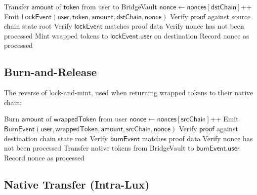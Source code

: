 \documentclass[11pt,a4paper]{article}
\begin{document}
\begin{algorithm}[H]
\caption{Lock-and-Mint Transfer Protocol}
\label{alg:lock_mint}
\begin{algorithmic}[1]
    \State Transfer $\mathsf{amount}$ of $\mathsf{token}$ from user to BridgeVault
    \State $\mathsf{nonce} \gets \mathsf{nonces}[\mathsf{dstChain}]$++
    \State Emit $\mathsf{LockEvent}(\mathsf{user}, \mathsf{token}, \mathsf{amount}, \mathsf{dstChain}, \mathsf{nonce})$
\EndProcedure
{}
    \State Verify $\mathsf{proof}$ against source chain state root
    \State Verify $\mathsf{lockEvent}$ matches proof data
    \State Verify nonce has not been processed
    \State Mint wrapped tokens to $\mathsf{lockEvent.user}$ on destination
    \State Record nonce as processed
\EndProcedure
\end{algorithmic}
\end{algorithm}

\subsection{Burn-and-Release}

The reverse of lock-and-mint, used when returning wrapped tokens to their native chain:

\begin{algorithm}[H]
\caption{Burn-and-Release Transfer Protocol}
\label{alg:burn_release}
\begin{algorithmic}[1]
    \State Burn $\mathsf{amount}$ of $\mathsf{wrappedToken}$ from user
    \State $\mathsf{nonce} \gets \mathsf{nonces}[\mathsf{srcChain}]$++
    \State Emit $\mathsf{BurnEvent}(\mathsf{user}, \mathsf{wrappedToken}, \mathsf{amount}, \mathsf{srcChain}, \mathsf{nonce})$
\EndProcedure
{}
    \State Verify $\mathsf{proof}$ against destination chain state root
    \State Verify $\mathsf{burnEvent}$ matches proof data
    \State Verify nonce has not been processed
    \State Transfer native tokens from BridgeVault to $\mathsf{burnEvent.user}$
    \State Record nonce as processed
\EndProcedure
\end{algorithmic}
\end{algorithm}

\subsection{Native Transfer (Intra-Lux)}
\end{document}
